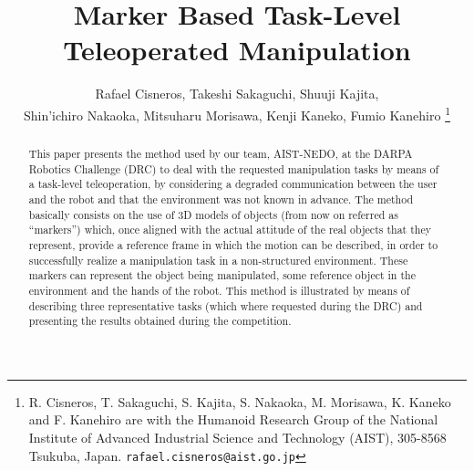 \documentclass[letterpaper, 10 pt, conference]{ieeeconf}
\begin{document}
	\title{\LARGE \bf Marker Based Task-Level Teleoperated Manipulation}

	\author{Rafael Cisneros, Takeshi Sakaguchi, Shuuji Kajita, \\
					Shin'ichiro Nakaoka, Mitsuharu Morisawa, Kenji Kaneko, Fumio Kanehiro
	\thanks{R. Cisneros, T. Sakaguchi, S. Kajita, S. Nakaoka, M. Morisawa, K. Kaneko and F. Kanehiro
					are with the Humanoid Research Group of the National Institute of Advanced Industrial Science
					and Technology (AIST), 305-8568 Tsukuba, Japan. {\tt\small rafael.cisneros@aist.go.jp}}}
  
	\maketitle

	\thispagestyle{empty}
	\pagestyle{empty}

	\begin{abstract}
		This paper presents the method used by our team, AIST-NEDO, at the DARPA Robotics Challenge (DRC) to deal with
		the requested manipulation tasks by means of a task-level teleoperation, by considering a degraded communication
		between the user and the robot and that the environment was not known in advance.
		The method basically consists on the use of 3D models of objects (from now on referred as ``markers'') which,
		once aligned with the actual attitude of the real objects that they represent, provide a reference frame in
		which the motion can be described, in order to successfully realize a manipulation task in a non-structured
		environment.
		These markers can represent the object being manipulated, some reference object in the environment and the
		hands of the robot.
		This method is illustrated by means of describing three representative tasks (which where requested during the DRC)
		and presenting the results obtained during the competition.
	\end{abstract}

	
	
		
		
	
		
	
		
	

	
		
	
	
	
	
	
	
	
\end{document}
